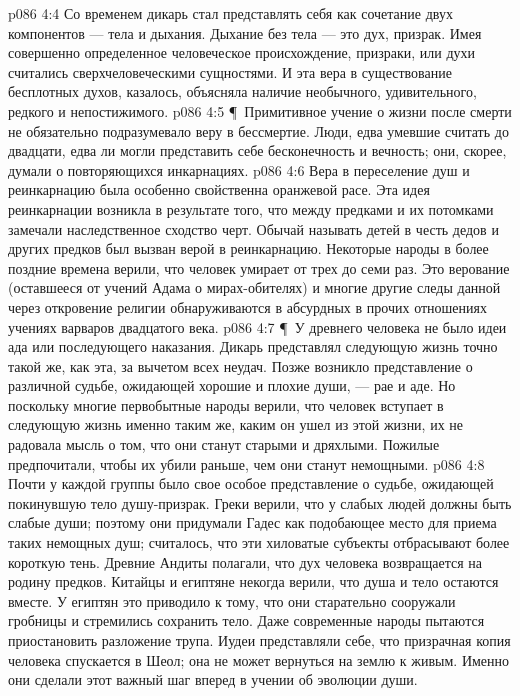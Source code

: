 \vs p086 4:4 Со временем дикарь стал представлять себя как сочетание двух компонентов --- тела и дыхания. Дыхание без тела --- это дух, призрак. Имея совершенно определенное человеческое происхождение, призраки, или духи считались сверхчеловеческими сущностями. И эта вера в существование бесплотных духов, казалось, объясняла наличие необычного, удивительного, редкого и непостижимого.
\vs p086 4:5 \P\ Примитивное учение о жизни после смерти не обязательно подразумевало веру в бессмертие. Люди, едва умевшие считать до двадцати, едва ли могли представить себе бесконечность и вечность; они, скорее, думали о повторяющихся инкарнациях.
\vs p086 4:6 Вера в переселение душ и реинкарнацию была особенно свойственна оранжевой расе. Эта идея реинкарнации возникла в результате того, что между предками и их потомками замечали наследственное сходство черт. Обычай называть детей в честь дедов и других предков был вызван верой в реинкарнацию. Некоторые народы в более поздние времена верили, что человек умирает от трех до семи раз. Это верование (оставшееся от учений Адама о мирах\hyp{}обителях) и многие другие следы данной через откровение религии обнаруживаются в абсурдных в прочих отношениях учениях варваров двадцатого века.
\vs p086 4:7 \P\ У древнего человека не было идеи ада или последующего наказания. Дикарь представлял следующую жизнь точно такой же, как эта, за вычетом всех неудач. Позже возникло представление о различной судьбе, ожидающей хорошие и плохие души, --- рае и аде. Но поскольку многие первобытные народы верили, что человек вступает в следующую жизнь именно таким же, каким он ушел из этой жизни, их не радовала мысль о том, что они станут старыми и дряхлыми. Пожилые предпочитали, чтобы их убили раньше, чем они станут немощными.
\vs p086 4:8 Почти у каждой группы было свое особое представление о судьбе, ожидающей покинувшую тело душу\hyp{}призрак. Греки верили, что у слабых людей должны быть слабые души; поэтому они придумали Гадес как подобающее место для приема таких немощных душ; считалось, что эти хиловатые субъекты отбрасывают более короткую тень. Древние Андиты полагали, что дух человека возвращается на родину предков. Китайцы и египтяне некогда верили, что душа и тело остаются вместе. У египтян это приводило к тому, что они старательно сооружали гробницы и стремились сохранить тело. Даже современные народы пытаются приостановить разложение трупа. Иудеи представляли себе, что призрачная копия человека спускается в Шеол; она не может вернуться на землю к живым. Именно они сделали этот важный шаг вперед в учении об эволюции души.
